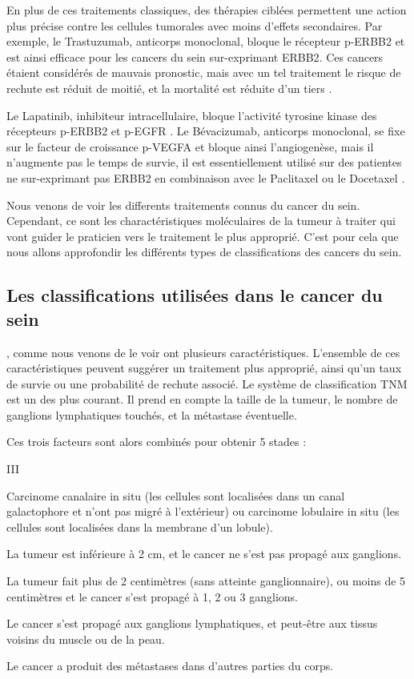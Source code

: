 			En plus de ces traitements classiques, des thérapies ciblées permettent une action plus précise contre les cellules tumorales avec moins d'effets secondaires.
			Par exemple, le Trastuzumab, anticorps monoclonal, bloque le récepteur \acs{p-ERBB2} et est ainsi efficace pour les cancers du sein sur-exprimant \acs{ERBB2}.
			Ces cancers étaient considérés de mauvais pronostic, mais avec un tel traitement le risque de rechute est réduit de moitié, et la mortalité est réduite d'un tiers \citep{Hudis2007}.

			Le Lapatinib, inhibiteur intracellulaire, bloque l'activité tyrosine kinase des récepteurs \acs{p-ERBB2} et \acs{p-EGFR} \citep{Burris2004,Higa2007}.
			Le Bévacizumab, anticorps monoclonal, se fixe sur le facteur de croissance \acs{p-VEGFA} et bloque ainsi l'angiogenèse, mais il n'augmente pas le temps de survie, il est essentiellement utilisé sur des patientes ne sur-exprimant pas \acs{ERBB2} en combinaison avec le Paclitaxel \citep{Miller2007a, Montero2012} ou le Docetaxel \citep{Miles2010}.

			Nous venons de voir les differents traitements connus du cancer du sein.
			Cependant, ce sont les charactéristiques moléculaires de la tumeur à traiter qui vont guider le praticien vers le traitement le plus approprié.
			C'est pour cela que nous allons approfondir les différents types de classifications des cancers du sein.

			\pagebreak

		\subsection{\textcolor{red!45!black}{Les classifications utilisées dans le cancer du sein}}
			, comme nous venons de le voir ont plusieurs caractéristiques.
			L'ensemble de ces caractéristiques peuvent suggérer un traitement plus approprié, ainsi qu'un taux de survie ou une probabilité de rechute associé.
			Le système de classification \ac{TNM} est un des plus courant.
			Il prend en compte la taille de la tumeur, le nombre de ganglions lymphatiques touchés, et la métastase éventuelle.

			Ces trois facteurs sont alors combinés pour obtenir 5 stades :
			\begin{mylist}{III}
				\item [0]   Carcinome canalaire in situ (les cellules sont localisées dans un canal galactophore et n'ont pas migré à l'extérieur) ou carcinome lobulaire in situ (les cellules sont localisées dans la membrane d'un lobule).
				\item [I]   La tumeur est inférieure à 2 cm, et le cancer ne s'est pas propagé aux ganglions.
				\item [II]  La tumeur fait plus de 2 centimètres (sans atteinte ganglionnaire), ou moins de 5 centimètres et le cancer s'est propagé à 1, 2 ou 3 ganglions.
				\item [III] Le cancer s'est propagé aux ganglions lymphatiques, et peut-être aux tissus voisins du muscle ou de la peau.
				\item [IV]  Le cancer a produit des métastases dans d'autres parties du corps.
			\end{mylist}

